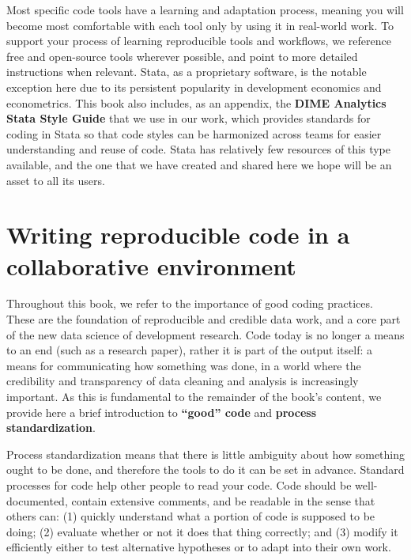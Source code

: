 Most specific code tools have a learning and adaptation process,
meaning you will become most comfortable with each tool
only by using it in real-world work.
To support your process of learning reproducible tools and workflows,
we reference free and open-source tools wherever possible,
and point to more detailed instructions when relevant.
Stata, as a proprietary software, is the notable exception here
due to its persistent popularity in development economics and econometrics.
This book also includes, as an appendix,
the \textbf{DIME Analytics Stata Style Guide}
that we use in our work, which provides
standards for coding in Stata so that code styles
can be harmonized across teams for easier understanding and reuse of code.
Stata has relatively few resources of this type available,
and the one that we have created and shared here
we hope will be an asset to all its users.


\section{Writing reproducible code in a collaborative environment}
Throughout this book, we refer to the importance of good coding practices.
These are the foundation of reproducible and credible data work,
and a core part of the new data science of development research.
Code today is no longer a means to an end (such as a research paper),
rather it is part of the output itself: a means for communicating how something was done,
in a world where the credibility and transparency of data cleaning and analysis is increasingly important.
As this is fundamental to the remainder of the book's content,
we provide here a brief introduction to \textbf{``good'' code} and \textbf{process standardization}.



Process standardization means that there is
little ambiguity about how something ought to be done,
and therefore the tools to do it can be set in advance.
Standard processes for code help other people to read your code.
Code should be well-documented, contain extensive comments, and be readable in the sense that others can:
(1) quickly understand what a portion of code is supposed to be doing;
(2) evaluate whether or not it does that thing correctly; and
(3) modify it efficiently either to test alternative hypotheses
or to adapt into their own work.



